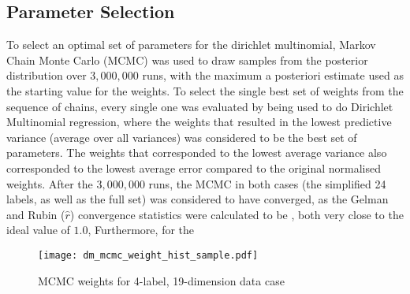 \subsection{Parameter Selection}

To select an optimal set of parameters for the dirichlet multinomial, Markov Chain Monte Carlo (MCMC) was used to draw samples from the posterior distribution  over $3,000,000$ runs, with the maximum a posteriori estimate used as the starting value for the weights. To select the single best set of weights from the sequence of chains, every single one was evaluated by being used to do Dirichlet Multinomial regression, where the weights that resulted in the lowest predictive variance (average over all variances) was considered to be the best set of parameters. The weights that corresponded to the lowest average variance also corresponded to the lowest average error compared to the original normalised weights. After the $3,000,000$ runs, the MCMC in both cases (the simplified 24 labels, as well as the full set) was considered to have converged, as the Gelman and Rubin ($\hat{r}$) convergence statistics were calculated to be , both very close to the ideal value of $1.0$, Furthermore, for the 



\begin{figure}[H]
    \centerline{\texttt{[image: dm\_mcmc\_weight\_hist\_sample.pdf]}}
    \caption{MCMC weights for 4-label, 19-dimension data case }
    \label{fig:mcmc_weights}
\end{figure}

